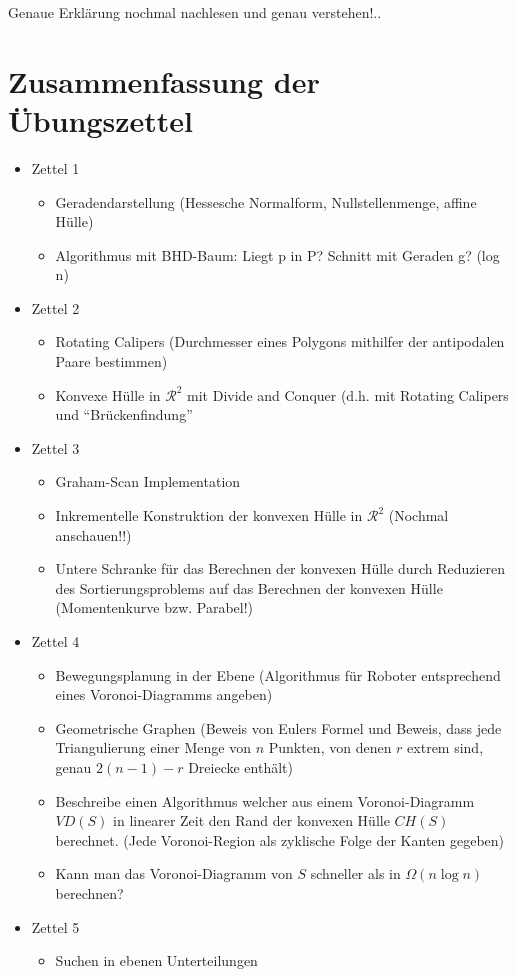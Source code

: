 \documentclass[a4paper]{article}
\begin{document}
Genaue Erklärung nochmal nachlesen und genau verstehen!..

\section*{Zusammenfassung der Übungszettel}
\begin{itemize}
	\item Zettel 1
	\begin{itemize}
		\item Geradendarstellung (Hessesche Normalform, Nullstellenmenge, affine Hülle)
		\item Algorithmus mit BHD-Baum: Liegt p in P? Schnitt mit Geraden g? (log n)
	\end{itemize}
	\item Zettel 2
	\begin{itemize}
		\item Rotating Calipers (Durchmesser eines Polygons mithilfer der antipodalen Paare bestimmen)
		\item Konvexe Hülle in $\mathcal{R}^2$ mit Divide and Conquer (d.h. mit Rotating Calipers und 
		"`Brückenfindung"'
	\end{itemize}
	\item Zettel 3
	\begin{itemize}
		\item Graham-Scan Implementation
		\item Inkrementelle Konstruktion der konvexen Hülle in $\mathcal{R}^2$ (Nochmal anschauen!!)
		\item Untere Schranke für das Berechnen der konvexen Hülle durch Reduzieren des Sortierungsproblems auf das Berechnen der konvexen Hülle (Momentenkurve bzw. Parabel!)
	\end{itemize}
	\item Zettel 4
	\begin{itemize}
		\item Bewegungsplanung in der Ebene (Algorithmus für Roboter entsprechend eines Voronoi-Diagramms angeben)
		\item Geometrische Graphen (Beweis von Eulers Formel und Beweis, dass jede Triangulierung
		einer Menge von $n$ Punkten, von denen $r$ extrem sind, genau $2(n-1) - r $ Dreiecke enthält)
		\item Beschreibe einen Algorithmus welcher aus einem Voronoi-Diagramm $VD(S)$ in linearer
		Zeit den Rand der konvexen Hülle $CH(S)$ berechnet. (Jede Voronoi-Region als zyklische Folge
		der Kanten gegeben)
		\item Kann man das Voronoi-Diagramm von $S$ schneller als in $\Omega(n \log n)$ berechnen?
	\end{itemize}
	\item Zettel 5	
	\begin{itemize}
		\item Suchen in ebenen Unterteilungen 
		

\end{itemize}
\end{itemize}
\end{document}
